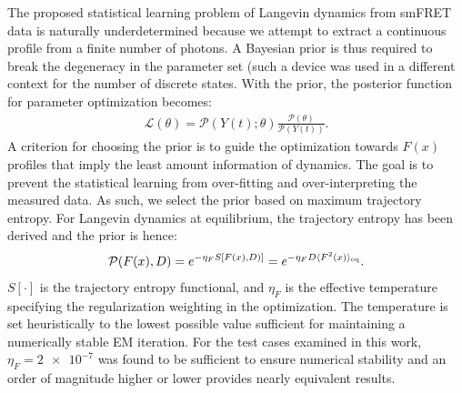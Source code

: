 \documentclass[journal=jpcbfk,manuscript=article,layout=twocolumn,articletitle=true]{achemso}
\begin{document}
The proposed statistical learning problem of Langevin dynamics from smFRET data is naturally underdetermined because we attempt to extract a continuous profile from a finite number of photons. A Bayesian prior is thus required to break the degeneracy in the parameter set (such a device was used in a different context for the number of discrete states\cite{Watkins:2005hba,Bayarri:2008tf}. With the prior, the posterior function for parameter optimization becomes:
\begin{align}
\mathcal{L}(\theta) = \mathcal{P}(Y(t); \theta) \frac{\mathcal{P}(\theta)}{\mathcal{P}(Y(t))}.
\end{align}
A criterion for choosing the prior is to guide the optimization towards $F(x)$ profiles that imply the least amount information of dynamics. The goal is to prevent the statistical learning from over-fitting and over-interpreting the measured data. As such, we select the prior based on maximum trajectory entropy. For Langevin dynamics at equilibrium, the trajectory entropy has been derived\cite{Haas:2013uj} and the prior is hence:
\begin{align}
\label{eq:HaasS}
\mathcal{P}(F(x),D) = e^{-\eta_FS[F(x),D)]} = e^{-\eta_F D\langle F^2(x) \rangle_{\rm{eq}} }.
\end{align}
$S[\cdot]$ is the trajectory entropy functional, and $\eta_F$ is the effective temperature specifying the regularization weighting in the optimization. The temperature is set heuristically to the lowest possible value sufficient for maintaining a numerically stable EM iteration. For the test cases examined in this work, $\eta_F = \num{2e-7}$ was found to be sufficient to ensure numerical stability and an order of magnitude higher or lower provides nearly equivalent results.   
\end{document}
